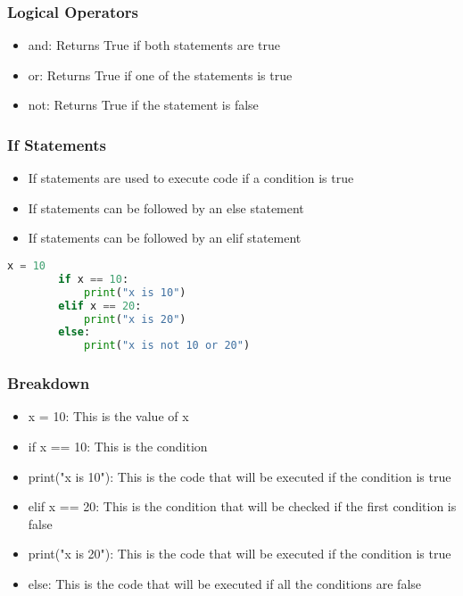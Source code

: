 \documentclass[serif, 9pt, aspectratio=32]{beamer}
\begin{document}
\begin{frame}
    \centering
    \frametitle{Logical Operators}
    \begin{itemize}
        \setlength{\itemsep}{3em}
        \item and: Returns True if both statements are true
        \item or: Returns True if one of the statements is true
        \item not: Returns True if the statement is false
    \end{itemize}
\end{frame}

\begin{frame}
    \centering
    \frametitle{If Statements}
    \begin{itemize}
        \setlength{\itemsep}{3em}
        \item If statements are used to execute code if a condition is true
        \item If statements can be followed by an else statement
        \item If statements can be followed by an elif statement
    \end{itemize}
\end{frame}

\begin{frame}[fragile]
    \begin{lstlisting}[language=Python]
        x = 10
        if x == 10:
            print("x is 10")
        elif x == 20:
            print("x is 20")
        else:
            print("x is not 10 or 20")
    \end{lstlisting}
\end{frame}

\begin{frame}
    \centering
    \frametitle{Breakdown}
    \begin{itemize}
        \setlength{\itemsep}{3em}
        \item x = 10: This is the value of x
        \item if x == 10: This is the condition
        \item print("x is 10"): This is the code that will be executed if the condition is true
        \item elif x == 20: This is the condition that will be checked if the first condition is false
        \item print("x is 20"): This is the code that will be executed if the condition is true
        \item else: This is the code that will be executed if all the conditions are false
    \end{itemize}
\end{frame}
\end{document}
